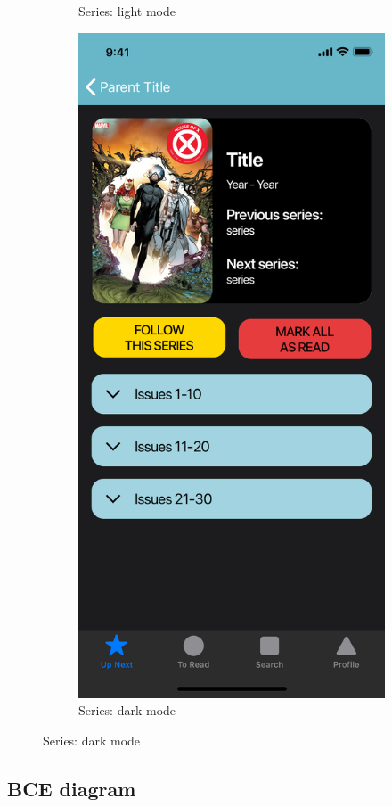 \begin{figure}[p]
\begin{subfigure}[b]{0.4\textwidth}
    \caption{Series: light mode}
    \label{fig:1}
  \end{subfigure}
  \hfill
  \begin{subfigure}[b]{0.4\textwidth}
    \includegraphics[width=\textwidth]{img/mockups/dark_mode}
    \caption{Series: dark mode}
    \label{fig:2}
  \end{subfigure}
\end{figure}

\clearpage


\subsection{BCE diagram}